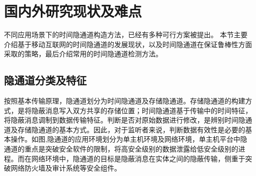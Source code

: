 \section{国内外研究现状及难点}
\label{sec:intro:background}

不同应用场景下的时间隐通道构造方法，已经有多种可行方案被提出。
本节主要介绍基于移动互联网的时间隐通道的发展现状，以及时间隐通道在保证鲁棒性方面采取的策略，最后介绍常用的时间隐通道检测方法。

\subsection{隐通道分类及特征}
\label{sec:intro:background:covert-channel}


按照基本传输原理，隐通道划分为时间隐通道及存储隐通道。存储隐通道的构建方式，是将隐蔽消息写入双方共享的存储位置；时间隐通道基于传输中的时间特征，将隐蔽消息调制到数据传输特征。判断是否对原始数据进行修改，是辨别时间隐通道及存储隐通道的基本方式。因此，对于监听者来说，判断数据有效性是必要的基本操作。如图,隐通道的应用环境划分为单主机环境及网络环境，单主机平台中隐通道的重点是突破安全软件的限制，将高安全级别的数据泄露给低安全级别的进程。而在网络环境中，隐通道的目标是隐蔽消息在实体之间的隐蔽传输，侧重于突破网络防火墙及审计系统等安全组件。

